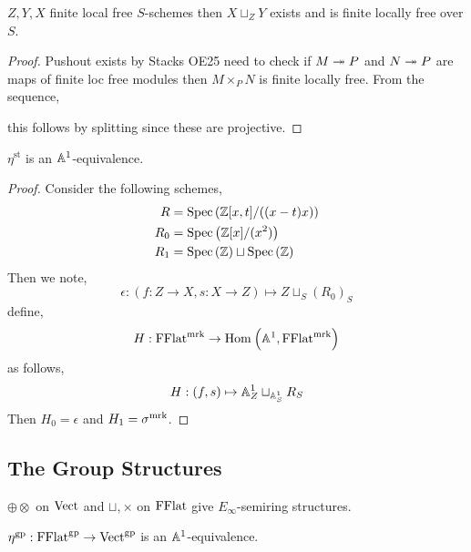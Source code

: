 \documentclass[12pt]{article}
\newcommand{\st}{\mathrm{st}}
\begin{document}
\begin{lemma}
\begin{center}
\end{center}
$Z, Y, X$ finite local free $S$-schemes then $X \sqcup_Z Y$ exists and is finite locally free over $S$.
\end{lemma}

\begin{proof}
Pushout exists by Stacks OE25 need to check if $M \twoheadrightarrow P$ and $N \twoheadrightarrow P$ are maps of finite loc free modules then $M \times_P N$ is finite locally free. From the sequence,
\begin{center}
\end{center}
this follows by splitting since these are projective. 
\end{proof}

\begin{theorem}
$\eta^{\st}$ is an $\mathbb{A}^1$-equivalence. 
\end{theorem}

\begin{proof}
Consider the following schemes,
\begin{align*}
R &= \mathrm{Spec}\left( \mathbb{Z}[x,t]/((x - t) x) \right)
\\
R_0 &= \mathrm{Spec}\left( \mathbb{Z}[x]/(x^2) \right)
\\
R_1 &= \mathrm{Spec}\left( \mathbb{Z} \right) \sqcup \mathrm{Spec}\left( \mathbb{Z} \right) 
\end{align*}
Then we note,
\[ \epsilon : (f : Z \to X, s : X \to Z) \mapsto Z \sqcup_S (R_0)_S \]
define,
\[ H : \mathrm{FFlat}^{\mathrm{mrk}} \to \mathrm{Hom}_{} \left( \mathbb{A}^1, \mathrm{FFlat}^{\mathrm{mrk}} \right) \]
as follows,
\[ H : (f, s) \mapsto \mathbb{A}^1_Z \sqcup_{\mathbb{A}^1_S} R_S \]
Then $H_0 = \epsilon$ and $H_1 = \sigma^{\mathrm{mrk}}$. 
\end{proof}

\subsection{The Group Structures}

$\oplus \otimes$ on $\mathrm{Vect}$ and $\sqcup, \times$ on $\mathrm{FFlat}$ give $E_{\infty}$-semiring structures.

\begin{theorem}
$\eta^{\mathrm{gp}} : \mathrm{FFlat}^{\mathrm{gp}} \to \mathrm{Vect}^{\mathrm{gp}}$ is an $\mathbb{A}^1$-equivalence.
\end{theorem}
\end{document}
